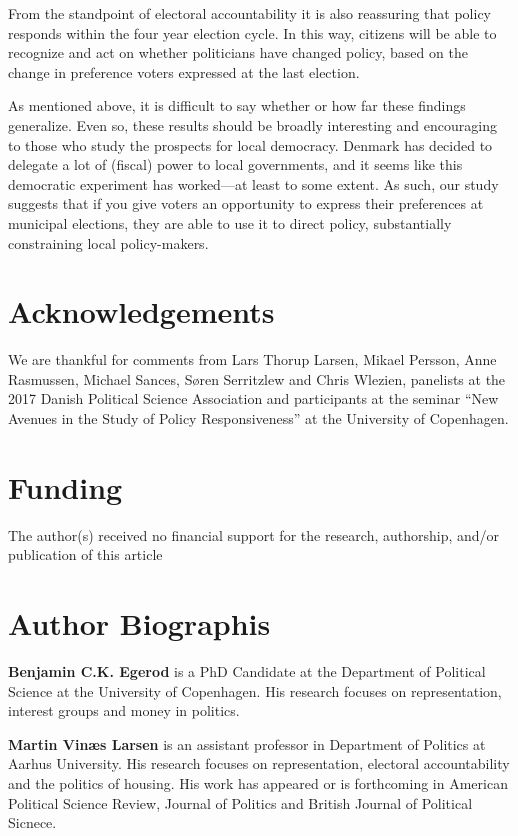 \documentclass[a4paper,12pt]{article}
\begin{document}
From the standpoint of electoral accountability it is also reassuring that policy responds within the four year election cycle. In this way, citizens will be able to recognize and act on whether politicians have changed policy, based on the change in preference voters expressed at the last election.  

As mentioned above, it is difficult to say whether or how far these findings generalize. Even so, these results should be broadly interesting and encouraging to those who study the prospects for local democracy.  Denmark has decided to delegate a lot of (fiscal) power to local governments, and it seems like this democratic experiment has worked---at least to some extent. As such, our study suggests that if you give voters an opportunity to express their preferences at municipal elections, they are able to use it to direct policy, substantially constraining local policy-makers.


\section*{Acknowledgements}
We are thankful for comments from Lars Thorup Larsen, Mikael Persson, Anne Rasmussen, Michael Sances, Søren Serritzlew and Chris Wlezien, panelists at the 2017 Danish Political Science Association and participants at the seminar ``New Avenues in the Study of Policy Responsiveness'' at the University of Copenhagen.


\section*{Funding}
The author(s) received no financial support for the research, authorship, and/or publication of this article

\theendnotes

\onehalfspacing



\clearpage

\renewcommand{\thesubsection}{\Alph{subsection}}
\renewcommand{\thetable}{\Alph{subsection}\arabic{table}}
\renewcommand{\thefigure}{\Alph{subsection}\arabic{figure}}


\section*{Author Biographis}

\noindent \textbf{Benjamin C.K. Egerod} is a PhD Candidate at the Department of Political Science at the University of Copenhagen. His research focuses on representation, interest groups and money in politics.

\vspace{0.1in}

\noindent \textbf{Martin Vinæs Larsen} is an assistant professor in Department of Politics at Aarhus University. His research focuses on representation,  electoral accountability and the politics of housing. His work has appeared or is forthcoming in American Political Science Review, Journal of Politics and British Journal of Political Sicnece.
\end{document}
